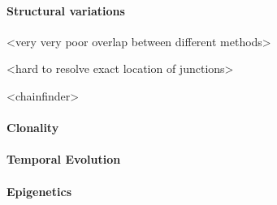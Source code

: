 \paragraph{Structural variations}
<very very poor overlap between different methods>

<hard to resolve exact location of junctions>

<chainfinder>
\paragraph{Clonality}
\paragraph{Temporal Evolution}
\paragraph{Epigenetics}




